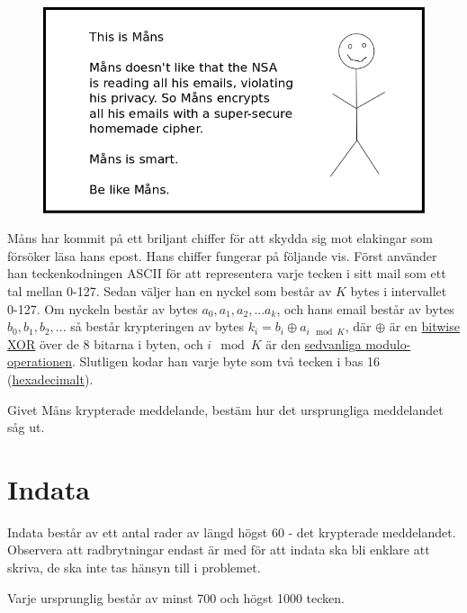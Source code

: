 
\begin{center}
  \begin{figure}[h!]
    \includegraphics[width=\textwidth]{mans.png}
  \end{figure}
\end{center}

Måns har kommit på ett briljant chiffer för att skydda sig mot elakingar som försöker läsa hans epost. Hans chiffer fungerar på följande vis. Först använder han teckenkodningen ASCII för att representera varje tecken i sitt mail som ett tal mellan 0-127. Sedan väljer han en nyckel som består av $K$ bytes i intervallet 0-127. Om nyckeln består av bytes $a_0, a_1, a_2, ... a_k$, och hans email består av bytes $b_0, b_1, b_2, ...$ så består krypteringen
av bytes $k_i = b_i \oplus a_{i \mod K}$, där $\oplus$ är en \href{https://en.wikipedia.org/wiki/Bitwise\_operation#XOR}{bitwise XOR} över de 8 bitarna i byten, och $i \mod K$ är den \href{https://en.wikipedia.org/wiki/Modulo\_operation}{sedvanliga modulo-operationen}. Slutligen kodar han varje byte som två tecken i bas 16 (\href{https://en.wikipedia.org/wiki/Hexadecimal}{hexadecimalt}).

Givet Måns krypterade meddelande, bestäm hur det ursprungliga meddelandet såg ut.

\section*{Indata}
Indata består av ett antal rader av längd högst 60 - det krypterade meddelandet. Observera att radbrytningar endast är med för att indata ska bli enklare att skriva, de ska inte tas hänsyn till i problemet.

Varje ursprunglig består av minst 700 och högst 1000 tecken.

